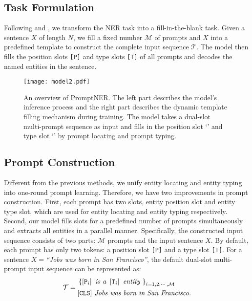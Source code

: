 \documentclass[11pt]{article}
\newcommand*{\img}[1]{\raisebox{-.2\baselineskip}{\texttt{[image: \#1]}}}
\begin{document}
\subsection{Task Formulation}
\label{3.1}

Following \citet{cui-etal-2021-template} and \citet{lee-etal-2022-good}, we transform the NER task into a fill-in-the-blank task. Given a sentence $X$ of length $N$, we fill a fixed number $\mathcal{M}$ of prompts and $X$ into a predefined template to construct the complete input sequence $\mathcal{T}$. The model then fills the position slots \texttt{[P]} and type slots \texttt{[T]} of all prompts and decodes the named entities in the sentence.


\begin{figure*}
    \centering
    \texttt{[image: model2.pdf]}
    \caption{An overview of PromptNER. The left part describes the model's inference process and the right part describes the dynamic template filling mechanism during training. The model takes a dual-slot multi-prompt sequence as input and fills in the position slot `\img{lan.pdf}' and type slot `\img{huang.pdf}'  by prompt locating and prompt typing.}
    \label{fig:model}
\end{figure*}

\subsection{Prompt Construction}
\label{3.2}


Different from the previous methods, we unify entity locating and entity typing into one-round prompt learning. Therefore, we have two improvements in prompt construction. First, each prompt has two slots, entity position slot and entity type slot, which are used for entity locating and entity typing respectively. Second, our model fills slots for a predefined number of prompts simultaneously and extracts all entities in a parallel manner.
Specifically, the constructed input sequence consists of two parts: $\mathcal{M}$ prompts and the input sentence $X$. By default, each prompt has only two tokens: a position slot \texttt{[P]} and a type slot \texttt{[T]}. For a sentence $X=$\textit{``Jobs was born in San Francisco''}, the default dual-slot multi-prompt input sequence can be represented as:
\begin{equation*}
\mathcal{T} =
\begin{aligned}
&\left\{\left[ \texttt{P}_{i}\right] \textit { is a }\left[\texttt{T}_{i}\right] \textit { entity }\right\}_{i=1,2, \cdots, \mathcal{M}} \\
& [\texttt{CLS}] \textit { Jobs was born in San Francisco.}
\end{aligned} \\
\end{equation*}
\end{document}
